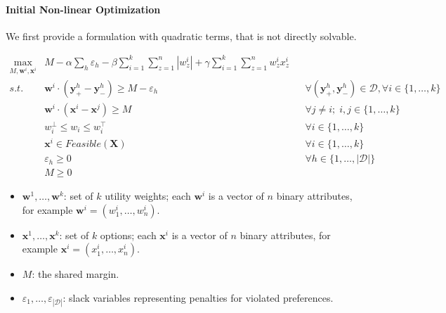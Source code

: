 \documentclass[a4paper,10pt]{article}
\newcommand{\veps}{\varepsilon}
\newcommand{\calD}{\mathcal{D}}
\newcommand{\bfx}{\mathbf{x}}
\newcommand{\bfX}{\mathbf{X}}
\newcommand{\bfy}{\mathbf{y}}
\newcommand{\bfw}{\mathbf{w}}
\begin{document}
% 


\paragraph{Initial Non-linear Optimization}
We first provide a formulation with quadratic terms, that is not directly solvable.

{\footnotesize
\begin{align} 
\max_{M, \bfw^i, \bfx^i} & M \!-\!  \alpha \sum_{h} \veps_h - \beta \sum_{i=1}^{k} \sum_{z=1}^{n}|w^i_{z}| + \gamma \sum_{i=1}^{k} \sum_{z=1}^{n} w^i_z x^i_z \\ %
s.t. \;\; & \bfw^i \cdot (\bfy^{h}_{+} - \bfy^{h}_{-} ) \geq M \! - \! \veps_{h} &  \!  &
\forall (\bfy^{h}_{+}, \bfy^{h}_{-}) \! \in \! \calD, \forall i \! \in \! \{ 1, \ldots, k\} \\
 & \bfw^i \cdot ( \bfx^i -  \bfx^j ) \geq M \;\; &  \!  &  \forall j \! \neq \! i; \; i,j \! \in \{  1, \ldots, k \}
 \label{cnst-wx-m} \\
 & w^{\bot}_i \leq w_i \leq w^{\top}_i & & \forall i \in \{ 1, \ldots, k \} \\
 & \bfx^i \in Feasible(\bfX) &  \!  & \forall i \in \{ 1, \ldots, k\} \\
 & \veps_h \geq 0 & & \forall h \in \{ 1,\ldots, |\calD| \} \\
 & M \geq 0 & &
\end{align}}

\begin{itemize}
 \item $\bfw^1,\ldots,\bfw^k$: set of $k$ utility weights; each $\bfw^i$ is a vector of $n$ binary attributes, for example $\bfw^i = (w^i_1,\ldots,w^i_n)$.
 \item $\bfx^1,\ldots,\bfx^k$: set of $k$ options; each  $\bfx^i$ is a vector of $n$ binary attributes, for example $\bfx^i = (x^i_1,\ldots,x^i_n)$.
 \item $M$: the shared margin.
 \item $\veps_1,\ldots,\veps_{|\calD|}$: slack variables representing penalties for violated preferences.
\end{itemize}
\end{document}
